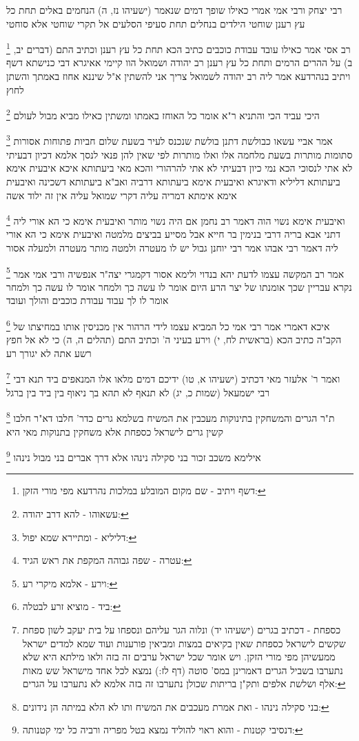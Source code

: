 \documentclass[12pt, openany]{book}
\newcommand{\footnotecomment}[1]{
	\renewcommand\thefootnote{}
	\footnote{#1}}
\newcommand{\commenta}[1]{\footnotecomment{#1}}
\begin{document}
{רבי יצחק ורבי אמי אמרי כאילו שופך דמים שנאמר (ישעיהו נז, ה) הנחמים באלים תחת כל עץ רענן שוחטי הילדים בנחלים תחת סעיפי הסלעים אל תקרי שוחטי אלא סוחטי 
\commenta{דשף ויתיב - שם מקום המובלע במלכות נהרדעא מפי מורי הזקן:}
רב אסי אמר כאילו עובד עבודת כוכבים כתיב הכא תחת כל עץ רענן וכתיב התם (דברים יב, ב) על ההרים הרמים ותחת כל עץ רענן 
רב יהודה ושמואל הוו קיימי אאיגרא דבי כנישתא דשף ויתיב בנהרדעא אמר ליה רב יהודה לשמואל צריך אני להשתין א"ל שיננא אחוז באמתך והשתן לחוץ 
\commenta{עשאוהו - להא דרב יהודה:}
היכי עביד הכי והתניא ר"א אומר כל האוחז באמתו ומשתין כאילו מביא מבול לעולם 
\commenta{דליליא - ומתיירא שמא יפול:}
אמר אביי עשאו כבולשת דתנן בולשת שנכנס לעיר בשעת שלום חביות פתוחות אסורות סתומות מותרות בשעת מלחמה אלו ואלו מותרות לפי שאין להן פנאי לנסך אלמא דכיון דבעיתי לא אתי לנסוכי הכא נמי כיון דבעיתי לא אתי להרהורי 
והכא מאי ביעתותא איכא איבעית אימא ביעתותא דליליא ודאיגרא ואיבעית אימא ביעתותא דרביה ואב"א ביעתותא דשכינה ואיבעית אימא אימתא דמריה עליה דקרי שמואל עליה אין זה ילוד אשה 
\commenta{עטרה - שפה גבוהה המקפת את ראש הגיד:}
ואיבעית אימא נשוי הוה דאמר רב נחמן אם היה נשוי מותר 
ואיבעית אימא כי הא אורי ליה דתני אבא בריה דרבי בנימין בר חייא אבל מסייע בביצים מלמטה ואיבעית אימא כי הא אורי ליה דאמר רבי אבהו אמר רבי יוחנן גבול יש לו מעטרה ולמטה מותר
מעטרה ולמעלה אסור 
\commenta{וירע - אלמא מיקרי רע:}
אמר רב המקשה עצמו לדעת יהא בנדוי ולימא אסור דקמגרי יצה"ר אנפשיה ורבי אמי אמר נקרא עבריין שכך אומנתו של יצר הרע היום אומר לו עשה כך ולמחר אומר לו עשה כך ולמחר אומר לו לך עבוד עבודת כוכבים והולך ועובד 
\commenta{ביד - מוציא זרע לבטלה:}
איכא דאמרי אמר רבי אמי כל המביא עצמו לידי הרהור אין מכניסין אותו במחיצתו של הקב"ה כתיב הכא (בראשית לח, י) וירע בעיני ה' וכתיב התם (תהלים ה, ה) כי לא אל חפץ רשע אתה לא יגורך רע 
\commenta{כספחת - דכתיב בגרים (ישעיהו יד) ונלוה הגר עליהם ונספחו על בית יעקב לשון ספחת שקשים לישראל כספחת שאין בקיאים במצות ומביאין פורענות ועוד שמא למדים ישראל ממעשיהן מפי מורי הזקן. ויש אומר שכל ישראל ערבים זה בזה ולאו מילתא היא שלא נתערבו בשביל הגרים דאמרינן במס' סוטה (דף לז:) נמצא לכל אחד מישראל שש מאות אלף ושלשת אלפים ותק"ן בריתות שכולן נתערבו זה בזה אלמא לא נתערבו על הגרים:}
ואמר ר' אלעזר מאי דכתיב (ישעיהו א, טו) ידיכם דמים מלאו אלו המנאפים ביד תנא דבי רבי ישמעאל (שמות כ, יג) לא תנאף לא תהא בך ניאוף בין ביד בין ברגל 
\commenta{בני סקילה נינהו - ואת אמרת מעכבים את המשיח ותו לא הלא במיתה הן נידונים:}
ת"ר הגרים והמשחקין בתינוקות מעכבין את המשיח בשלמא גרים כדר' חלבו דא"ר חלבו קשין גרים לישראל כספחת אלא משחקין בתנוקות מאי היא 
\commenta{דנסיבי קטנות - והוא ראוי להוליד נמצא בטל מפריה ורביה כל ימי קטנותה:}
אילימא משכב זכור בני סקילה נינהו אלא דרך אברים בני מבול נינהו 
}
\end{document}
